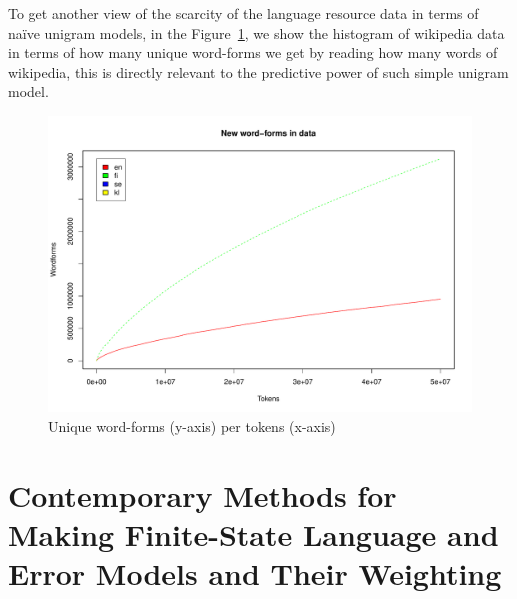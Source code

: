 \documentclass[a4paper,12pt]{article}
\begin{document}
To get another view of the scarcity of the language resource data in terms
of naïve unigram models, in the Figure~\ref{fig:forms-vs-tokens}, we show the
histogram of wikipedia data in terms of how many unique word-forms we get by
reading how many words of wikipedia, this is directly relevant to the
predictive power of such simple unigram model.

\begin{figure}
    \centering
    \includegraphics[width=\textwidth]{graphicx/formspertokens}
    \caption{Unique word-forms (y-axis) per tokens (x-axis)
    \label{fig:forms-vs-tokens}}
\end{figure}

\section{Contemporary Methods for Making Finite-State Language and Error Models
and Their Weighting}
\label{sec:methods}
\end{document}
